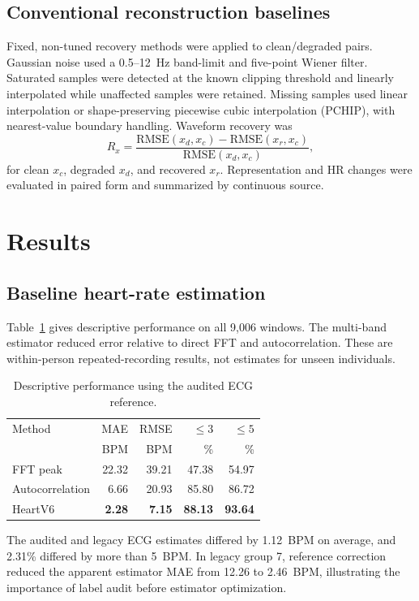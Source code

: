 \documentclass[10pt,twocolumn]{article}
\begin{document}
\subsection{Conventional reconstruction baselines}
Fixed, non-tuned recovery methods were applied to clean/degraded pairs. Gaussian noise used a 0.5--12~Hz band-limit and five-point Wiener filter. Saturated samples were detected at the known clipping threshold and linearly interpolated while unaffected samples were retained. Missing samples used linear interpolation or shape-preserving piecewise cubic interpolation (PCHIP), with nearest-value boundary handling. Waveform recovery was
\begin{equation}
R_x=\frac{\mathrm{RMSE}(x_d,x_c)-\mathrm{RMSE}(x_r,x_c)}
{\mathrm{RMSE}(x_d,x_c)},
\end{equation}
for clean $x_c$, degraded $x_d$, and recovered $x_r$. Representation and HR changes were evaluated in paired form and summarized by continuous source.

\section{Results}
\subsection{Baseline heart-rate estimation}
Table~\ref{tab:baseline} gives descriptive performance on all 9,006 windows. The multi-band estimator reduced error relative to direct FFT and autocorrelation. These are within-person repeated-recording results, not estimates for unseen individuals.

\begin{table}[t]
\centering
\caption{Descriptive performance using the audited ECG reference.}
\label{tab:baseline}
\begin{tabular}{lrrrr}
\toprule
Method & MAE & RMSE & $\leq3$ & $\leq5$ \\
 & BPM & BPM & \% & \% \\
\midrule
FFT peak & 22.32 & 39.21 & 47.38 & 54.97 \\
Autocorrelation & 6.66 & 20.93 & 85.80 & 86.72 \\
HeartV6 & \textbf{2.28} & \textbf{7.15} & \textbf{88.13} & \textbf{93.64} \\
\bottomrule
\end{tabular}
\end{table}

The audited and legacy ECG estimates differed by 1.12~BPM on average, and 2.31\% differed by more than 5~BPM. In legacy group 7, reference correction reduced the apparent estimator MAE from 12.26 to 2.46~BPM, illustrating the importance of label audit before estimator optimization.
\end{document}
